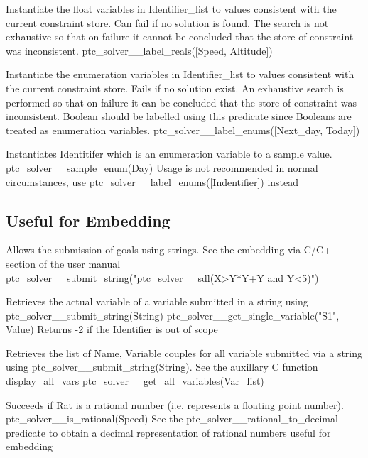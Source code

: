 \documentclass{article}
\begin{document}
    {Instantiate the float variables in Identifier\_list to values consistent
with the
    current constraint store. Can fail if no solution is found. The search is
not exhaustive so that on failure it cannot be concluded that the store
of constraint was inconsistent.}
    {ptc\_solver\_\_label\_reals([Speed, Altitude])}
    {}

    {Instantiate the enumeration variables in Identifier\_list to values
consistent
    with the current constraint store. Fails if no solution exist. An
exhaustive search is performed so that on failure it can be concluded
that the store of constraint was inconsistent. Boolean should be labelled
using this predicate since Booleans are treated as enumeration
variables.}
    {ptc\_solver\_\_label\_enums([Next\_day, Today])}
    {}

        {Instantiates Identitifer which is an enumeration variable to a sample
value.}
        {ptc\_solver\_\_sample\_enum(Day)}
        {Usage is not recommended in normal circumstances, use
ptc\_solver\_\_label\_enums([Indentifier]) instead}


\subsection{Useful for Embedding}

\hspace{\parindent}
        {Allows the submission of goals using strings. See the embedding via
C/C++ section of the user manual}
        {ptc\_solver\_\_submit\_string("ptc\_solver\_\_sdl(X>Y*Y+Y and Y<5)")}
        {}

        {Retrieves the actual variable of a variable submitted in a string using
ptc\_solver\_\_submit\_string(String)}
        {ptc\_solver\_\_get\_single\_variable("S1", Value)}
        {Returns -2 if the Identifier is out of scope}

        {Retrieves the list of Name, Variable couples for all variable submitted
via a string using  ptc\_solver\_\_submit\_string(String).
         See the auxillary C function display\_all\_vars}
        {ptc\_solver\_\_get\_all\_variables(Var\_list)}
        {}

        {Succeeds if Rat is a rational number (i.e. represents a floating point
number).}
        {ptc\_solver\_\_is\_rational(Speed)}
        {See the ptc\_solver\_\_rational\_to\_decimal predicate to obtain a
decimal representation
         of rational numbers useful for embedding}
\end{document}
